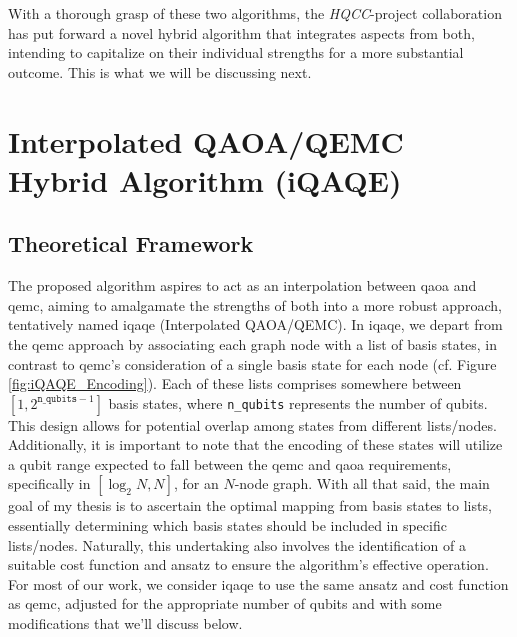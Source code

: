 With a thorough grasp of these two algorithms, the \textit{HQCC}-project collaboration has put forward a novel hybrid algorithm that integrates aspects from both, intending to capitalize on their individual strengths for a more substantial outcome. This is what we will be discussing next.

\section{Interpolated QAOA/QEMC Hybrid Algorithm (iQAQE)}
\label{section:iQAQE}


\subsection{Theoretical Framework}
\label{subsection:iQAQE Theoretical Framework}
The proposed algorithm aspires to act as an interpolation between \acrshort{qaoa} and \acrshort{qemc}, aiming to amalgamate the strengths of both into a more robust approach, tentatively named \acrshort{iqaqe} (Interpolated QAOA/QEMC). In \acrshort{iqaqe}, we depart from the \acrshort{qemc} approach by associating each graph node with a list of basis states, in contrast to \acrshort{qemc}'s consideration of a single basis state for each node (cf. Figure \ref{fig:iQAQE_Encoding}). Each of these lists comprises somewhere between $\left[1, 2^{\texttt{n\_qubits}-1}\right]$ basis states, where \texttt{n\_qubits} represents the number of qubits. This design allows for potential overlap among states from different lists/nodes. Additionally, it is important to note that the encoding of these states will utilize a qubit range expected to fall between the \acrshort{qemc} and \acrshort{qaoa} requirements, specifically in $[\log_2{N}, N]$, for an $N$-node graph. With all that said, the main goal of my thesis is to ascertain the optimal mapping from basis states to lists, essentially determining which basis states should be included in specific lists/nodes. Naturally, this undertaking also involves the identification of a suitable cost function and ansatz to ensure the algorithm's effective operation. For most of our work, we consider \acrshort{iqaqe} to use the same ansatz and cost function as \acrshort{qemc}, adjusted for the appropriate number of qubits and with some modifications that we'll discuss below.

